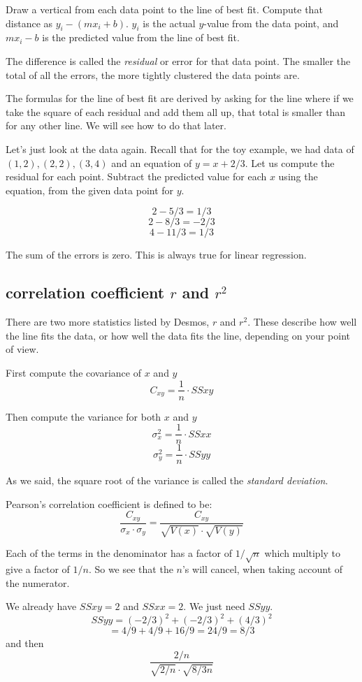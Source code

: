 \documentclass[11pt, oneside]{article}
\begin{document}
Draw a vertical from each data point to the line of best fit.  Compute that distance as $y_i - (mx_i + b)$.  $y_i$ is the actual $y$-value from the data point, and $mx_i - b$ is the predicted value from the line of best fit.

The difference is called the \emph{residual} or error for that data point.  The smaller the total of all the errors, the more tightly clustered the data points are.

The formulas for the line of best fit are derived by asking for the line where if we take the square of each residual and add them all up, that total is smaller than for any other line.  We will see how to do that later.

Let's just look at the data again.  Recall that for the toy example, we had data of $(1,2),(2,2),(3,4)$ and an equation of $y = x + 2/3$.  Let us compute the residual for each point.  Subtract the predicted value for each $x$ using the equation, from the given data point for $y$.

\[ 2 - 5/3 = 1/3 \]
\[ 2 - 8/3 = -2/3 \]
\[ 4 - 11/3 = 1/3 \]

The sum of the errors is zero.  This is always true for linear regression.

\subsection*{correlation coefficient $r$ and $r^2$}

There are two more statistics listed by Desmos, $r$ and $r^2$.  These describe how well the line fits the data, or how well the data fits the line, depending on your point of view.

First compute the covariance of $x$ and $y$
\[ C_{xy} = \frac{1}{n} \cdot SSxy \]

Then compute the variance for both $x$ and $y$
\[ \sigma^2_x = \frac{1}{n} \cdot SSxx \]
\[ \sigma^2_y = \frac{1}{n} \cdot SSyy \]

As we said, the square root of the variance is called the \emph{standard deviation}.

Pearson's correlation coefficient is defined to be:
\[ \frac{C_{xy}}{\sigma_x \cdot \sigma_y} = \frac{C_{xy}}{\sqrt{V(x)} \cdot \sqrt{V(y)}} \]

Each of the terms in the denominator has a factor of $1/\sqrt{n}$ which multiply to give a factor of $1/n$.  So we see that the $n$'s will cancel, when taking account of the numerator.

We already have $SSxy = 2$ and $SSxx = 2$.  We just need $SSyy$.
\[ SSyy = (-2/3)^2 + (-2/3)^2 + (4/3)^2 \]
\[ = 4/9 + 4/9 + 16/9 = 24/9 = 8/3 \]
and then
\[ \frac{2/n}{\sqrt{2/n} \cdot \sqrt{8/3n}} \]
\end{document}
